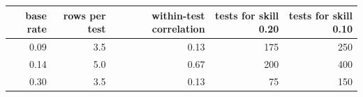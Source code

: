 \begin{tabular}{rrrrr}
\toprule
base rate & rows per test & within-test correlation & tests for skill 0.20 & tests for skill 0.10 \\
\midrule
0.09 & 3.5 & 0.13 & 175 & 250 \\
0.14 & 5.0 & 0.67 & 200 & 400 \\
0.30 & 3.5 & 0.13 & 75 & 150 \\
\bottomrule
\end{tabular}

